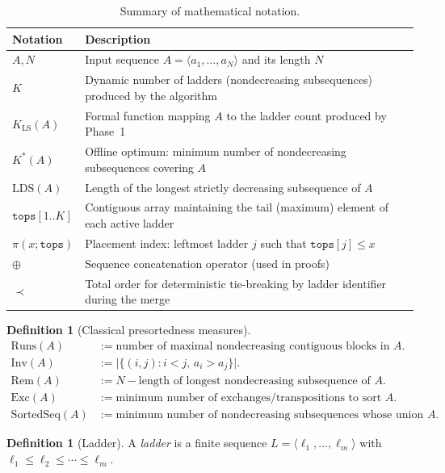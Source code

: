 \documentclass[12pt,a4paper]{article}
\theoremstyle{plain}
\theoremstyle{definition}
\newtheorem{definition}[theorem]{Definition}
\begin{document}
\begin{table}[h]
\centering
\caption{Summary of mathematical notation.}
\label{tab:notation}
\begin{tabular}{ll}
\toprule
Notation & Description \\
\midrule
$A,N$ & Input sequence $A=\langle a_1,\ldots,a_N\rangle$ and its length $N$ \\
$K$ & Dynamic number of ladders (nondecreasing subsequences) produced by the algorithm \\
$K_{\mathrm{LS}}(A)$ & Formal function mapping $A$ to the ladder count produced by Phase~1 \\
$K^*(A)$ & Offline optimum: minimum number of nondecreasing subsequences covering $A$ \\
$\mathrm{LDS}(A)$ & Length of the longest strictly decreasing subsequence of $A$ \\
$\mathtt{tops}[1..K]$ & Contiguous array maintaining the tail (maximum) element of each active ladder \\
$\pi(x;\mathtt{tops})$ & Placement index: leftmost ladder $j$ such that $\mathtt{tops}[j] \leq x$ \\
$\oplus$ & Sequence concatenation operator (used in proofs) \\
$\prec$ & Total order for deterministic tie-breaking by ladder identifier during the merge \\
\bottomrule
\end{tabular}
\end{table}
 
\begin{definition}[Classical presortedness measures]
\label{def:measures}
\begin{align}
\mathrm{Runs}(A) &:= \text{number of maximal nondecreasing contiguous blocks in }A. \\
\mathrm{Inv}(A) &:= \bigl|\{(i,j) : i < j,\, a_i > a_j\}\bigr|. \\
\mathrm{Rem}(A) &:= N - \text{length of longest nondecreasing subsequence of }A. \\
\mathrm{Exc}(A) &:= \text{minimum number of exchanges/transpositions to sort }A. \\
\mathrm{SortedSeq}(A) &:= \text{minimum number of nondecreasing subsequences whose union covers }A.
\end{align}
\end{definition}
 
\begin{definition}[Ladder]
\label{def:ladder}
A \emph{ladder} is a finite sequence $L = \langle \ell_1, \ldots, \ell_m \rangle$ with $\ell_1 \leq \ell_2 \leq \cdots \leq \ell_m$.
\end{definition}
 
\end{document}
